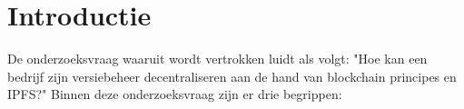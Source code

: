 
\section{Introductie} %
\label{sec:introductie}

De onderzoeksvraag waaruit wordt vertrokken luidt als volgt: "Hoe kan een bedrijf zijn versiebeheer decentraliseren aan de hand van blockchain principes en IPFS?" Binnen deze onderzoeksvraag zijn er drie begrippen:\\\\
